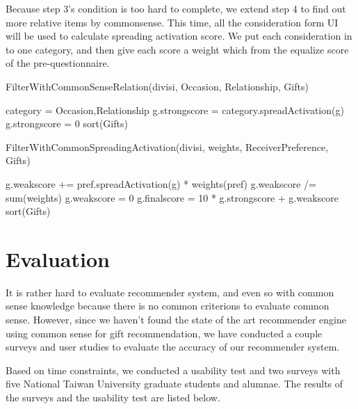 \documentclass[11pt,twocolumn]{article}
\begin{document}
Because step 3’s condition is too hard to complete, we extend step 4 to find out more relative items by commonsense.  This time, all the consideration form UI will be used to calculate spreading activation score.   We put each consideration in to one category, and then give each score a weight which from the equalize score of the pre-questionnaire.


\begin{algorithm}
\caption{FilterWithCommonSenseRelation(divisi, Occasion, Relationship, Gifts)}
\label{fwcr}
\begin{algorithmic}
\STATE category = {Occasion,Relationship}
        \STATE g.strongscore = category.spreadActivation(g)
        \STATE g.strongscore = 0
    \ENDIF
\ENDFOR
\STATE sort(Gifts)
\end{algorithmic}
\end{algorithm}



\begin{algorithm}
\caption{FilterWithCommonSpreadingActivation(divisi, weights, ReceiverPreference, Gifts)}
\label{fwcsa}
\begin{algorithmic}
        \STATE g.weakscore += pref.spreadActivation(g) * weights(pref)
    \ENDFOR
    \STATE g.weakscore /= sum(weights)
        \STATE g.weakscore = 0
    \ENDIF
\ENDFOR
{}
\STATE g.finalscore = 10 * g.strongscore + g.weakscore
\ENDFOR
\STATE sort(Gifts)
\end{algorithmic}
\end{algorithm}

\newpage

\section{Evaluation}
It is rather hard to evaluate recommender system, and even so with common sense knowledge because there is no
common criterions to evaluate common sense. However, since we haven't found the state of the art recommender engine
using common sense for gift recommendation, we have conducted a couple surveys and user studies to evaluate the accuracy
of our recommender system.

Based on time constraints, we conducted a usability test and two surveys with five National Taiwan University graduate students and alumnae.
The results of the surveys and the usability test are listed below.
\end{document}
